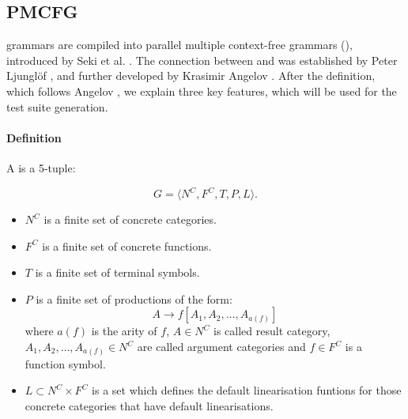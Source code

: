 \subsection{PMCFG}
\label{sec:PMCFG}

\gf{} grammars are compiled into parallel multiple context-free
grammars (\pmcfg), introduced by Seki et al. \cite{seki91pmcfg}. The
connection between \gf{} and \pmcfg{} was established by Peter
Ljunglöf \cite{ljunglof2004}, and further developed by Krasimir
Angelov \cite{angelov2010phd}. 
After the definition, which follows Angelov \cite{angelov2010phd}, we
explain three key features, which will be used for the test suite generation.

\paragraph{Definition} A \pmcfg{} is a 5-tuple:

\[
 G = \langle N^C, F^C, T, P, L \rangle.
\]

\begin{itemize}
\item $N^C$ is a finite set of concrete categories.

\item $F^C$ is a finite set of concrete functions. %


\item $T$ is a finite set of terminal symbols.

\item $P$ is a finite set of productions of the form:
$$
A \rightarrow f[A_1,A_2,\dots,A_{a(f)}]
$$
where $a(f)$ is the arity of $f$, $A \in N^C$ is called result category, $A_1,A_2,\dots,A_{a(f)} \in N^C$ are called argument categories and $f \in F^C$ is a function symbol.
\item $L \subset N^C \times F^C$ is a set which defines the default linearisation funtions for those concrete categories that have default linearisations. 
\end{itemize}




